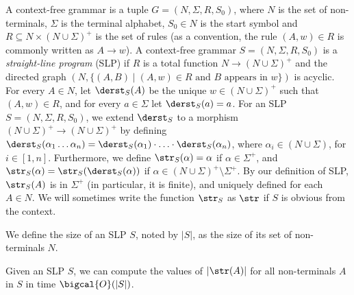 
	A context-free grammar is a tuple $G = (N,\Sigma,R,S_0)$, where $N$ is the set of non-terminals, $\Sigma$ is the terminal alphabet, $S_0\in N$ is the start symbol and $R\subseteq N \times(N \cup\Sigma)^{+}$ is the set of rules (as a convention, the rule $(A,w) \in R$ is commonly written as $A\to w$). A context-free grammar $S = (N,\Sigma,R,S_0)$ is a \emph{straight-line
program} (SLP) if $R$ is a total function $N\to(N \cup\Sigma)^{+}$ and the directed graph $(N, \{(A,B)\mid (A,w) \in R \text{ and } B\text{ appears in } w\})$ is acyclic. 
For every $A \in N$, let $\derst_S(A)$ be the unique $w \in (N \cup\Sigma)^{+}$ such that $(A,w) \in R$, and for every $a \in \Sigma$ let $\derst_S(a) = a$.
For an SLP $S = (N,\Sigma,R,S_0)$, we extend $\derst_S$ to a morphism $(N \cup\Sigma)^{+}\to(N \cup\Sigma)^{+}$ by defining $\derst_S(\alpha_1 \ldots \alpha_n) = \derst_S(\alpha_1)\cdot \ldots \cdot \derst_S(\alpha_n)$, where $\alpha_i \in (N \cup\Sigma)$, for $i\in[1,n] $. Furthermore, we define $\str_S(\alpha) = \alpha$ if $\alpha\in\Sigma^+$, and $\str_S(\alpha) = \str_S(\derst_S(\alpha))$ if $\alpha\in (N\cup\Sigma)^+\setminus\Sigma^+$. By our definition of SLP, $\str_S(A)$ is in $\Sigma^+$ (in particular, it is finite), and uniquely defined for each $A\in N$. We will sometimes write the function $\str_S$ as $\str$ if $S$ is obvious from the context.


We define the size of an SLP $S$, noted by $|S|$, as the size of its set of non-terminals $N$.
	
	\begin{lemma}\label{slps:sizes}
		Given an SLP $S$, we can compute the values of $|\str(A)|$ for all non-terminals $A$ in $S$ in time $\bigcal{O}(|S|)$.		
	\end{lemma}

